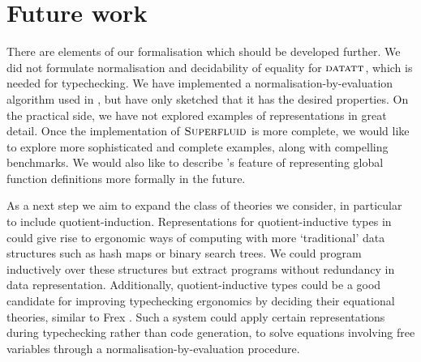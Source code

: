
\section{Future work}


There are elements of our formalisation which should be developed further. We
did not formulate normalisation and decidability of equality for ${\textsc{datatt}}$,
which is needed for typechecking. We have implemented a
normalisation-by-evaluation \cite{Abel2013-fq} algorithm used in \superfluid, but have only
sketched that it has the desired properties. On the practical side, we have not
explored examples of representations in great detail. Once the implementation of
$\textsc{Superfluid}$ is more complete, we would like to explore more sophisticated and
complete examples, along with compelling benchmarks. We would also like to
describe \superfluid's feature of representing global function definitions more
formally in the future.

As a next step we aim to expand the class of theories we consider, in particular
to include quotient-induction. Representations for quotient-inductive types in
could give rise to ergonomic ways of computing with more `traditional' data
structures such as hash maps or binary search trees. We could program
inductively over these structures but extract programs without redundancy in
data representation. Additionally, quotient-inductive types could be a good
candidate for improving typechecking ergonomics by deciding their equational
theories, similar to Frex \cite{Allais2023-rg}. Such a system could
apply certain representations during typechecking rather than code generation,
to solve equations involving free variables through a normalisation-by-evaluation
procedure.


